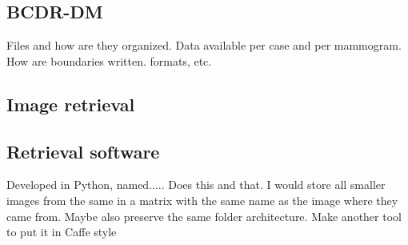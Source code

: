 \documentclass[11pt]{article}
\begin{document}
	\subsection{BCDR-DM}
	Files and how are they organized. Data available per case and per mammogram. How are boundaries written. formats, etc.

	\subsection{Image retrieval}
	

	\subsection{Retrieval software}
Developed in Python, named..... Does this and that. I would store all smaller images from the same in a matrix with the same name as the image where they came from. Maybe also preserve the same folder architecture.
Make another tool to put it in Caffe style

\end{document}
